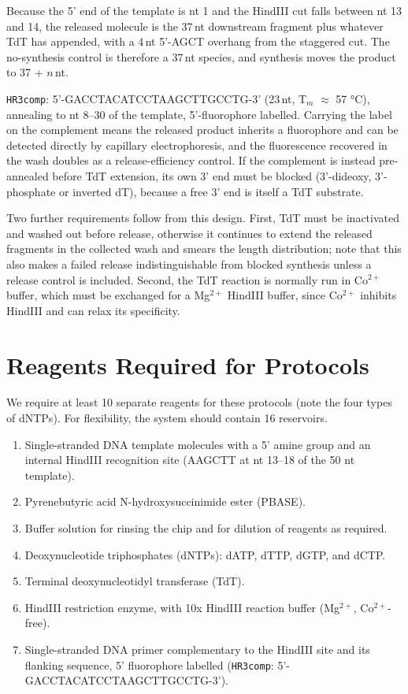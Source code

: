 \documentclass[11pt]{article}
\begin{document}
Because the 5' end of the template is nt 1 and the HindIII cut falls between nt 13 and 14, the released molecule is the 37\,nt downstream fragment plus whatever TdT has appended, with a 4\,nt 5'-AGCT overhang from the staggered cut.
The no-synthesis control is therefore a 37\,nt species, and synthesis moves the product to 37 + $n$\,nt.

\texttt{HR3comp}: 5'-GACCTACATCCTAAGCTTGCCTG-3' (23\,nt, T$_m$ $\approx$ 57 °C), annealing to nt 8--30 of the template, 5'-fluorophore labelled.
Carrying the label on the complement means the released product inherits a fluorophore and can be detected directly by capillary electrophoresis, and the fluorescence recovered in the wash doubles as a release-efficiency control.
If the complement is instead pre-annealed before TdT extension, its own 3' end must be blocked (3'-dideoxy, 3'-phosphate or inverted dT), because a free 3' end is itself a TdT substrate.

Two further requirements follow from this design.
First, TdT must be inactivated and washed out before release, otherwise it continues to extend the released fragments in the collected wash and smears the length distribution; note that this also makes a failed release indistinguishable from blocked synthesis unless a release control is included.
Second, the TdT reaction is normally run in Co$^{2+}$ buffer, which must be exchanged for a Mg$^{2+}$ HindIII buffer, since Co$^{2+}$ inhibits HindIII and can relax its specificity.

\section*{Reagents Required for Protocols}

We require at least 10 separate reagents for these protocols (note the four types of dNTPs).
For flexibility, the system should contain 16 reservoirs.

\begin{enumerate}
    \item Single-stranded DNA template molecules with a 5' amine group and an internal HindIII recognition site (AAGCTT at nt 13--18 of the 50 nt template).
    \item Pyrenebutyric acid N-hydroxysuccinimide ester (PBASE).
    \item Buffer solution for rinsing the chip and for dilution of reagents as required.
    \item Deoxynucleotide triphosphates (dNTPs): dATP, dTTP, dGTP, and dCTP.
    \item Terminal deoxynucleotidyl transferase (TdT).
    \item HindIII restriction enzyme, with 10x HindIII reaction buffer (Mg$^{2+}$, Co$^{2+}$-free).
    \item Single-stranded DNA primer complementary to the HindIII site and its flanking sequence, 5' fluorophore labelled (\texttt{HR3comp}: 5'-GACCTACATCCTAAGCTTGCCTG-3').
\end{enumerate}
\end{document}
